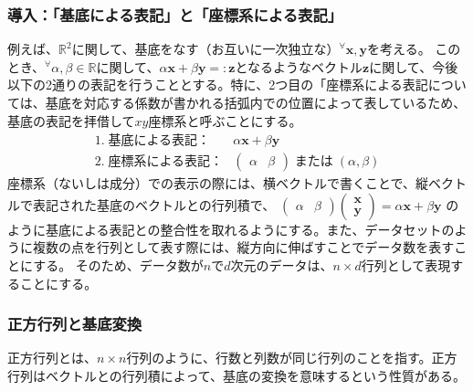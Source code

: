 \documentclass[10pt]{ujarticle}
\begin{document}
\subsubsection{導入：「基底による表記」と「座標系による表記」}
例えば、$\mathbb{R}^2$に関して、基底をなす（お互いに一次独立な）$^\forall\mathbf{x,y}$を考える。
このとき、$^\forall\alpha,\beta\in\mathbb{R}$に関して、$\alpha\mathbf{x}+\beta\mathbf{y}=:\mathbf{z}$となるようなベクトル$\mathbf{z}$に関して、今後以下の2通りの表記を行うこととする。特に、2つ目の「座標系による表記については、基底を対応する係数が書かれる括弧内での位置によって表しているため、基底の表記を拝借して$xy$座標系と呼ぶことにする。
$$
\begin{aligned}
  1.\;\text{基底による表記：}&\alpha\mathbf{x}+\beta\mathbf{y}\\
  2.\;\text{座標系による表記：}&\begin{pmatrix}\alpha&\beta\end{pmatrix}\;\text{または}\;(\alpha,\beta)
\end{aligned}
$$
座標系（ないしは成分）での表示の際には、横ベクトルで書くことで、縦ベクトルで表記された基底のベクトルとの行列積で、
$\begin{pmatrix}\alpha&\beta\end{pmatrix}\begin{pmatrix}\mathbf{x}\\\mathbf{y}\end{pmatrix}=\alpha\mathbf{x}+\beta\mathbf{y}$
のように基底による表記との整合性を取れるようにする。また、データセットのように複数の点を行列として表す際には、縦方向に伸ばすことでデータ数を表すことにする。
そのため、データ数が$n$で$d$次元のデータは、$n\times d$行列として表現することにする。

\subsubsection{正方行列と基底変換}
正方行列とは、$n\times n$行列のように、行数と列数が同じ行列のことを指す。正方行列はベクトルとの行列積によって、基底の変換を意味するという性質がある。
\end{document}
